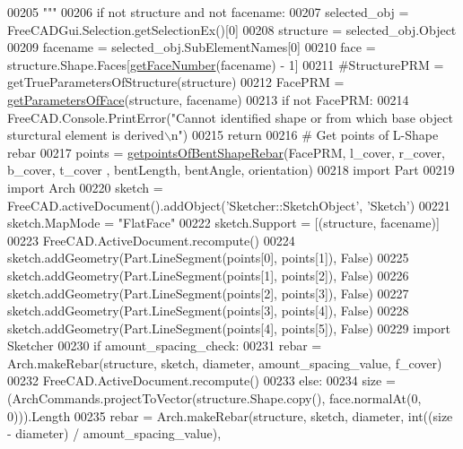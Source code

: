 \begin{DoxyCode}
00205 \textcolor{stringliteral}{    """}
00206     \textcolor{keywordflow}{if} \textcolor{keywordflow}{not} structure \textcolor{keywordflow}{and} \textcolor{keywordflow}{not} facename:
00207         selected\_obj = FreeCADGui.Selection.getSelectionEx()[0]
00208         structure = selected\_obj.Object
00209         facename = selected\_obj.SubElementNames[0]
00210     face = structure.Shape.Faces[\hyperlink{namespaceRebarfunc_a3885b3b63e3a41508ac79bc7550cf301}{getFaceNumber}(facename) - 1]
00211     \textcolor{comment}{#StructurePRM = getTrueParametersOfStructure(structure)}
00212     FacePRM = \hyperlink{namespaceRebarfunc_a92122b3d7cedd3d47bb63380a5ac4d08}{getParametersOfFace}(structure, facename)
00213     \textcolor{keywordflow}{if} \textcolor{keywordflow}{not} FacePRM:
00214         FreeCAD.Console.PrintError(\textcolor{stringliteral}{"Cannot identified shape or from which base object sturctural element is
       derived\(\backslash\)n"})
00215         \textcolor{keywordflow}{return}
00216     \textcolor{comment}{# Get points of L-Shape rebar}
00217     points = \hyperlink{namespaceBentShapeRebar_a33951a8ab21a73bae42af9f81d7c43c3}{getpointsOfBentShapeRebar}(FacePRM, l\_cover, r\_cover, b\_cover, t\_cover
      , bentLength, bentAngle, orientation)
00218     \textcolor{keyword}{import} Part
00219     \textcolor{keyword}{import} Arch
00220     sketch = FreeCAD.activeDocument().addObject(\textcolor{stringliteral}{'Sketcher::SketchObject'}, \textcolor{stringliteral}{'Sketch'})
00221     sketch.MapMode = \textcolor{stringliteral}{"FlatFace"}
00222     sketch.Support = [(structure, facename)]
00223     FreeCAD.ActiveDocument.recompute()
00224     sketch.addGeometry(Part.LineSegment(points[0], points[1]), \textcolor{keyword}{False})
00225     sketch.addGeometry(Part.LineSegment(points[1], points[2]), \textcolor{keyword}{False})
00226     sketch.addGeometry(Part.LineSegment(points[2], points[3]), \textcolor{keyword}{False})
00227     sketch.addGeometry(Part.LineSegment(points[3], points[4]), \textcolor{keyword}{False})
00228     sketch.addGeometry(Part.LineSegment(points[4], points[5]), \textcolor{keyword}{False})
00229     \textcolor{keyword}{import} Sketcher
00230     \textcolor{keywordflow}{if} amount\_spacing\_check:
00231         rebar = Arch.makeRebar(structure, sketch, diameter, amount\_spacing\_value, f\_cover)
00232         FreeCAD.ActiveDocument.recompute()
00233     \textcolor{keywordflow}{else}:
00234         size = (ArchCommands.projectToVector(structure.Shape.copy(), face.normalAt(0, 0))).Length
00235         rebar = Arch.makeRebar(structure, sketch, diameter, int((size - diameter) / amount\_spacing\_value), 

\end{DoxyCode}
